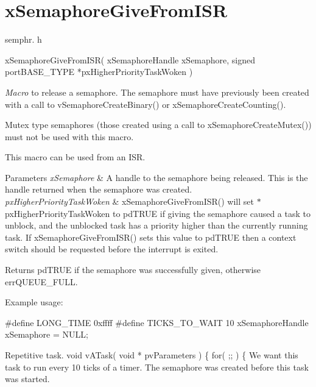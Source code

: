 \hypertarget{group__x_semaphore_give_from_i_s_r}{\section{x\-Semaphore\-Give\-From\-I\-S\-R}
\label{group__x_semaphore_give_from_i_s_r}
}
semphr. h 
\begin{DoxyPre}
 xSemaphoreGiveFromISR( 
                          xSemaphoreHandle xSemaphore, 
                          signed portBASE\_TYPE *pxHigherPriorityTaskWoken
                      )\end{DoxyPre}


{\itshape Macro} to release a semaphore. The semaphore must have previously been created with a call to v\-Semaphore\-Create\-Binary() or x\-Semaphore\-Create\-Counting().

Mutex type semaphores (those created using a call to x\-Semaphore\-Create\-Mutex()) must not be used with this macro.

This macro can be used from an I\-S\-R.


\begin{DoxyParams}{Parameters}
{\em x\-Semaphore} & A handle to the semaphore being released. This is the handle returned when the semaphore was created.\\
\hline
{\em px\-Higher\-Priority\-Task\-Woken} & x\-Semaphore\-Give\-From\-I\-S\-R() will set $\ast$px\-Higher\-Priority\-Task\-Woken to pd\-T\-R\-U\-E if giving the semaphore caused a task to unblock, and the unblocked task has a priority higher than the currently running task. If x\-Semaphore\-Give\-From\-I\-S\-R() sets this value to pd\-T\-R\-U\-E then a context switch should be requested before the interrupt is exited.\\
\hline
\end{DoxyParams}
\begin{DoxyReturn}{Returns}
pd\-T\-R\-U\-E if the semaphore was successfully given, otherwise err\-Q\-U\-E\-U\-E\-\_\-\-F\-U\-L\-L.
\end{DoxyReturn}
Example usage\-: 
\begin{DoxyPre}
 \#define LONG\_TIME 0xffff
 \#define TICKS\_TO\_WAIT 10
 xSemaphoreHandle xSemaphore = NULL;\end{DoxyPre}



\begin{DoxyPre}Repetitive task.
 void vATask( void * pvParameters )
 \{
    for( ;; )
    \{
We want this task to run every 10 ticks of a timer.  The semaphore 
was created before this task was started.\end{DoxyPre}



